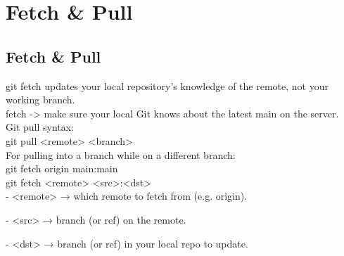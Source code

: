 \chapter{Fetch \& Pull}
\section{Fetch \& Pull}
git fetch updates your local repository’s knowledge of the remote, not your working branch.\\
fetch -> make sure your local Git knows about the latest main on the server.\\

Git pull syntax:\\
git pull <remote> <branch>
\\
For pulling into a branch while on a different branch:\\
git fetch origin main:main\\
git fetch <remote> <src>:<dst>\\
- <remote> → which remote to fetch from (e.g. origin).

- <src> → branch (or ref) on the remote.

- <dst> → branch (or ref) in your local repo to update.